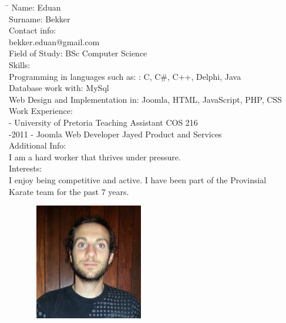 \documentclass[12pt]{article}
\begin{document}
	\begin{tabbing}
		\hspace*{3.5cm}\=\hspace*{3cm} \kill	
		Name: \> Eduan \\
		Surname: \> Bekker \\
		Contact info:  \\
			\> bekker.eduan@gmail.com \\
		Field of Study: \> BSc Computer Science \\
		Skills:  \\
			\> Programming in languages such as: : C, C\#, C++, Delphi, Java \\
			\> Database work with: MySql \\
			\> Web Design and Implementation in: Joomla, HTML, JavaScript, PHP, CSS  \\
		Work Experience: \\
			 - University of Pretoria Teaching Assistant COS 216 \\
			-2011 - Joomla Web Developer Jayed Product and Services \\
		Additional Info:  \\
			\> I am a hard worker that thrives under pressure. \\
		Interests: \\
			\> I enjoy being competitive and active. I have been part of the Provinsial \\ \> Karate team for the past 7 years. \\
	\end{tabbing}

	\newpage %
	\begin{figure}[htbp]
		\centering
		\includegraphics[width=2in, height=2in]{./Pictures/DannyPretorius.jpg}
	\end{figure}
\end{document}
